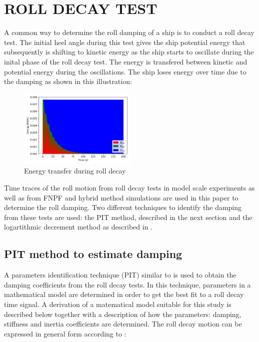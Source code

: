 \section*{ROLL DECAY TEST}\label{roll-decay-test}

A common way to determine the roll damping of a ship is to conduct a
roll decay test. The initial heel angle during this test gives the ship
potential energy that subsequently is shifting to kinetic energy as the
ship starts to oscillate during the inital phase of the roll decay test.
The energy is transfered between kinetic and potential energy during the
oscillations. The ship loses energy over time due to the damping as
shown in this illustration:
 
            
    
    \begin{figure}[H]
        \begin{center}\includegraphics[width = 0.5\textwidth]{figures/energy.png}\end{center}
        \vspace{-1cm}
        \caption{Energy transfer during roll decay}
        \label{fig:energy}
    \end{figure}
    

    Time traces of the roll motion from roll decay tests in model scale
experiments as well as from FNPF and hybrid method simulations are used
in this paper to determine the roll damping. Two different techniques to
identify the damping from these tests are used: the PIT method,
described in the next section and the logartithmic decrement method as
described in \cite{7505983/BYNJ8CFG}.

\subsection*{PIT method to estimate damping}\label{pit-method}

A parameters identification technique (PIT) similar to
\cite{7505983/EXYJELCU} is used to obtain the damping coefficients from
the roll decay tests. In this technique, parameters in a mathematical
model are determined in order to get the best fit to a roll decay time
signal. A derivation of a matematical model suitable for this study is
described below together with a description of how the parameters:
damping, stiffness and inertia coefficients are determined. The roll
decay motion can be expressed in general form according to
\cite{7505983/FB64RGPF}:
 

